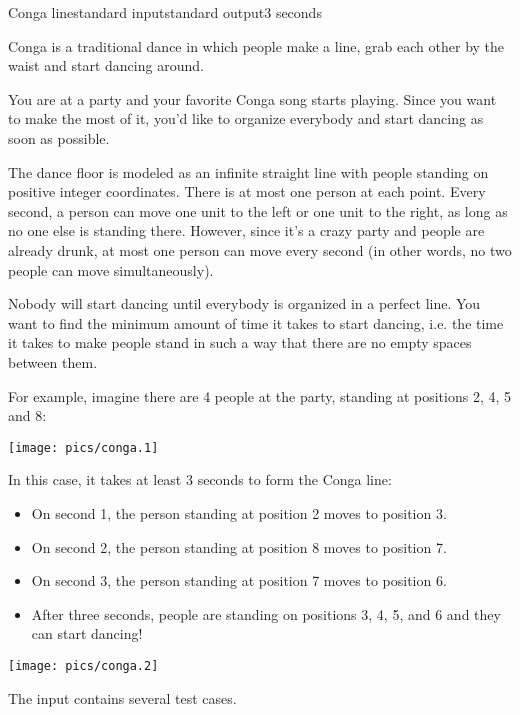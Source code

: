\begin{problem}{Conga line}{standard input}{standard output}{3 seconds}

Conga is a traditional dance in which people make a line, grab each other by the waist and start dancing around.

You are at a party and your favorite Conga song starts playing. Since you want to make the most of it, you'd like to organize everybody and start dancing as soon as possible.

The dance floor is modeled as an infinite straight line with people standing on positive integer coordinates. There is at most one person at each point.
Every second, a person can move one unit to the left or one unit to the right, as long as no one else is standing there. However, since
it's a crazy party and people are already drunk, at most one person can move every second (in other words, no two people can move simultaneously).

Nobody will start dancing until everybody is organized in a perfect line. You want to find the minimum amount of time it takes to start dancing, i.e. the time it takes to make people stand in such a way that there are no empty spaces between them.

For example, imagine there are 4 people at the party, standing at positions 2, 4, 5 and 8:

\begin{center}
\texttt{[image: pics/conga.1]}
\end{center}


In this case, it takes at least 3 seconds to form the Conga line:
\begin{itemize}
  \item On second 1, the person standing at position 2 moves to position 3.
  \item On second 2, the person standing at position 8 moves to position 7.
  \item On second 3, the person standing at position 7 moves to position 6.
  \item After three seconds, people are standing on positions 3, 4, 5, and 6 and they can start dancing!
\end{itemize}

\begin{center}
\texttt{[image: pics/conga.2]}
\end{center}


\InputFile

The input contains several test cases.


\end{problem}
